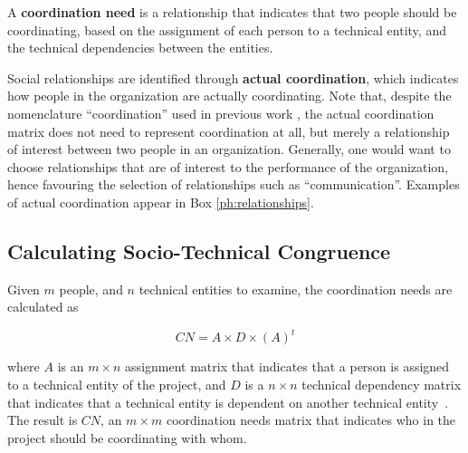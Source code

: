 \documentclass[12pt,oneside]{book}
\begin{document}

A \textbf{coordination need} is a relationship that indicates that two people should be coordinating, based on the assignment of each person to a technical entity, and the technical dependencies between the entities.

Social relationships are identified through \textbf{actual coordination}, which indicates how people in the organization are actually coordinating. Note that, despite the nomenclature ``coordination'' used in previous work \cite{cataldo:cscw:2006}, the actual coordination matrix does not need to represent coordination at all, but merely a relationship of interest between two people in an organization. Generally, one would want to choose relationships that are of interest to the performance of the organization, hence favouring the selection of relationships such as ``communication''. Examples of actual coordination appear in Box \ref{ph:relationships}.




\subsection{Calculating Socio-Technical Congruence}
\label{sec:stc}

Given $m$ people, and $n$ technical entities to examine, the coordination needs are calculated as 

\[ CN = A \times D \times (A)^t \]

\noindent where $A$ is an $m \times n$ assignment matrix that indicates that a person is assigned to a technical entity of the project, and $D$ is a $n \times n$ technical dependency matrix that indicates that a technical entity is dependent on another technical entity~\cite{cataldo:cscw:2006}. The result is $CN$, an $m \times m$ coordination needs matrix that indicates who in the project should be coordinating with whom.

\end{document}
